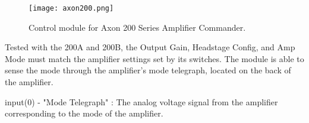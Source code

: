 \label{axon200commander}

\begin{figure}[h]
\begin{center}
\texttt{[image: axon200.png]}
\caption[axon200]{Control module for Axon 200 Series Amplifier Commander.}
\end{center}
\end{figure}

Tested with the 200A and 200B, the Output Gain, Headstage Config, and Amp Mode must match the amplifier settings set by its switches. The module is able to sense the mode through the amplifier's mode telegraph, located on the back of the amplifier.

input(0) - "Mode Telegraph" : The analog voltage signal from the amplifier corresponding to the mode of the amplifier.